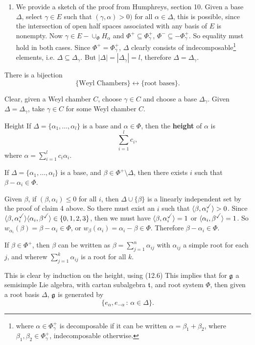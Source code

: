 \documentclass{article}
\begin{document}
\begin{enumerate}
    \item We provide a sketch of the proof from Humphreys, section 10. \gap Given a base $\Delta$, select $\gamma \in E$ such that $(\gamma, \alpha) > 0)$ for all $\alpha \in \Delta$, this is possible, since the intersection of  open half spaces associated with any basis of $E$ is nonempty. Now $\gamma \in E - \cup_{\Phi} H_{\alpha}$ and $\Phi^{+} \subseteq \Phi^{+}_{\gamma}$, $\Phi^{-} \subseteq -\Phi_{\gamma}^{+}$. So equality must hold in both cases. Since $\Phi^{+} = \Phi^{+}_{\gamma}$, $\Delta$ clearly consists of indecomposable\footnote{where $\alpha \in \Phi_{\gamma}^{+}$ is decomposable if it can be written $\alpha = \beta_{1} + \beta_{2}$, where $\beta_{1},\beta_{2} \in \Phi_{\gamma}^{+}$, indecomposable otherwise.} elements, i.e. $\Delta \subseteq \Delta_{\gamma}$. But $|\Delta| = |\Delta_{\gamma}|=l$, therefore $\Delta = \Delta_{\gamma}.$ \endproof
\end{enumerate}
\begin{corr}{}
    There is a bijection \[ \{\text{Weyl Chambers} \} \leftrightarrow \{ \text{root bases} \}. \]
\end{corr}
\proof Clear, given a Weyl chamber $C$, choose $\gamma \in C$ and choose a base $\Delta_{\gamma}$. Given $\Delta=\Delta_{\gamma}$, take $\gamma \in C$ for some Weyl chamber $C$. \endproof
\begin{fancydefine}{Height}
    If $\Delta = \{\alpha_{1}, \dots, \alpha_{l}\}$ is a base and $\alpha \in \Phi$, then the \textbf{height} of $\alpha$ is \[ \sum_{i=1}^{l}c_{i}, \] where $\alpha = \sum_{i=1}^{l}c_{i}\alpha_{i}$.
\end{fancydefine}
\begin{fancylem}{}
    If $\Delta = \{\alpha_{1}, \dots, \alpha_{l}\}$ is a base, and $\beta \in \Phi^{+} \setminus \Delta$, then there exists $i$ such that $\beta - \alpha_{i} \in \Phi$.
\end{fancylem}
\proof Given $\beta$, if $(\beta, \alpha_{i}) \leq 0$ for all $i$, then $\Delta \cup \{ \beta \}$ is a linearly independent set by the proof of claim 4 above. So there must exist an $i$ such that $\langle \beta, \alpha_{i}^{\checked} \rangle>0$. Since $\langle \beta, \alpha_{i}^{\checked} \rangle \langle \alpha_{i}, \beta^{\checked} \rangle \in \{0,1,2,3\}$, then we must have $\langle \beta, \alpha_{i}^{\checked} \rangle = 1$ or $\langle \alpha_{i}, \beta^{\checked} \rangle = 1$. So $w_{\alpha_{i}}(\beta) = \beta - \alpha_{i} \in \Phi$, or $w_{\beta}(\alpha_{i})=\alpha_{i}-\beta \in \Phi$. Therefore $\beta-\alpha_{i} \in \Phi$. \endproof
\begin{corr}{}
    If $\beta \in \Phi^{+}$, then $\beta$ can be written as $\beta = \sum_{j=1}^{n}\alpha_{ij}$ with $\alpha_{ij}$ a simple root for each $j$, and wherew $\sum_{j=1}^{k}\alpha_{ij}$ is a root for all $k$.
\end{corr}
\proof This is clear by induction on the height, using (12.6) \endproof
This implies that for $\mathfrak{g}$ a semisimple Lie algebra, with cartan subalgebra $\mathfrak{t}$, and root system $\Phi$, then given a root basis $\Delta$, $\mathfrak{g}$ is generated by \[ \{e_{\alpha}, e_{-\alpha} \, : \, \alpha \in \Delta\}.\]
\end{document}
